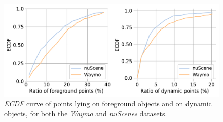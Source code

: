 \begin{figure}[t!]
     \centering
        \includegraphics[width=1.0\columnwidth]{figs/figure/dataset_stats.pdf}
       \caption{\textit{ECDF} curve of points lying on foreground objects and on dynamic objects, for both the \emph{Waymo} and \emph{nuScenes} datasets.}
   \label{fig:dataset_ecdf}
\end{figure}